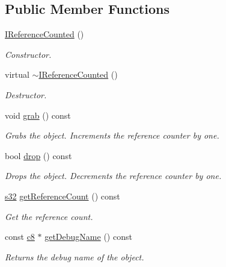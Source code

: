 \subsection*{Public Member Functions}
\begin{DoxyCompactItemize}
\item 
\hyperlink{classirr_1_1IReferenceCounted_a8411682018e68a2752d4c82675c71040}{I\+Reference\+Counted} ()\hypertarget{classirr_1_1IReferenceCounted_a8411682018e68a2752d4c82675c71040}{}\label{classirr_1_1IReferenceCounted_a8411682018e68a2752d4c82675c71040}

\begin{DoxyCompactList}\small\item\em Constructor. \end{DoxyCompactList}\item 
virtual \hyperlink{classirr_1_1IReferenceCounted_a78abc75801cbb13d9db0955b3c07251c}{$\sim$\+I\+Reference\+Counted} ()\hypertarget{classirr_1_1IReferenceCounted_a78abc75801cbb13d9db0955b3c07251c}{}\label{classirr_1_1IReferenceCounted_a78abc75801cbb13d9db0955b3c07251c}

\begin{DoxyCompactList}\small\item\em Destructor. \end{DoxyCompactList}\item 
void \hyperlink{classirr_1_1IReferenceCounted_a2b7a035532e5f409ca9482dab79185f4}{grab} () const 
\begin{DoxyCompactList}\small\item\em Grabs the object. Increments the reference counter by one. \end{DoxyCompactList}\item 
bool \hyperlink{classirr_1_1IReferenceCounted_afb169a857e0d2cdb96b8821cb9bff17a}{drop} () const 
\begin{DoxyCompactList}\small\item\em Drops the object. Decrements the reference counter by one. \end{DoxyCompactList}\item 
\hyperlink{namespaceirr_ac66849b7a6ed16e30ebede579f9b47c6}{s32} \hyperlink{classirr_1_1IReferenceCounted_a198560456588db46331f06eda909a399}{get\+Reference\+Count} () const 
\begin{DoxyCompactList}\small\item\em Get the reference count. \end{DoxyCompactList}\item 
const \hyperlink{namespaceirr_a9395eaea339bcb546b319e9c96bf7410}{c8} $\ast$ \hyperlink{classirr_1_1IReferenceCounted_a768e697e55d496e396b3acc5003d2bea}{get\+Debug\+Name} () const 
\begin{DoxyCompactList}\small\item\em Returns the debug name of the object. \end{DoxyCompactList}\end{DoxyCompactItemize}
